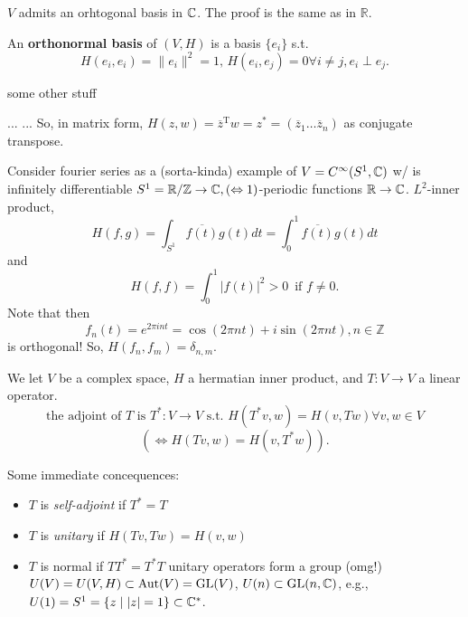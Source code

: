 \documentclass{article}
\begin{document}
\begin{theorem}
  \( V \) admits an orhtogonal basis in \( \CC\). The proof is the same as in \( \mathbb{R} \). 
\end{theorem}

\begin{definition}
  An \textbf{orthonormal basis} of \( (V,H) \) is a basis \( \{e_i\}   \) s.t. 
  \begin{displaymath}
    H(e_i,e_i)=\|e_i\|^2 =1, \, H(e_i,e_j)=0 \forall i\neq j, e_i \perp e_j. 
  \end{displaymath}
  
\end{definition}

some other stuff


...
...
So, in matrix form, \( H(z,w)=\overline{z}^{\text{T}}w =z^*=(\overline{z}_{1}\ldots \overline{z}_n) \) as conjugate transpose. 

Consider fourier series as a (sorta-kinda) example of \( V=C^{\infty} (S^1,\CC) \) w/ is infinitely differentiable \( S^1=\mathbb{R}/\mathbb{Z} \to  \CC, (\iff 1)\)-periodic functions \( \mathbb{R} \to  \CC \). \( L^2 \)-inner product, \[
  H(f,g)=\int_{S^1}\overline{f(t)} g(t)dt = \int_0^1 \overline{f(t)} g(t)dt\]
  and 
  \[
    H(f,f) = \int _0^1|f(t)|^2 > 0\,  \text{ if } f\neq 0
  .\] 
  Note that then \[ f_n(t) =e^{2 \pi  i nt} = \cos (2 \pi  nt) + i \sin  (2 \pi  nt), n \in  \mathbb{Z}\] is orthogonal! So, \( H(f_n,f_m)=\delta _{n,m}  \). 


\begin{definition}
 We let \( V \) be a complex space, \( H \) a hermatian inner product, and \( T:V \to  V \) a linear operator.
  \begin{displaymath}
    \text{the adjoint of } T \text{ is } T^* : V \to  V \text{ s.t. } H(T^*v,w)=H(v,Tw) \forall v,w \in  V
  \end{displaymath}
  \[
    (\iff H(Tv,w)=H(v,T^*w))
  .\] 


\end{definition}
Some immediate concequences:
\begin{itemize}
  \item \( T \) is \textit{self-adjoint} if \( T^*=T \)
  \item \(  T \) is \textit{unitary} if \( H(Tv,Tw)=H(v,w) \)
  \item \( T \) is normal if \( TT^*=T^*T \)
    unitary operators form a group (omg!) \( U(V)=U(V,H) \subset \operatorname{Aut}(V) = \text{GL}(V) \), \( U(n) \subset  \text{GL}(n,\CC) \), e.g., \( U(1)=S^1=\{z \mid  |z| = 1\} \subset  \CC[*]  \). 
\end{itemize}
\end{document}
